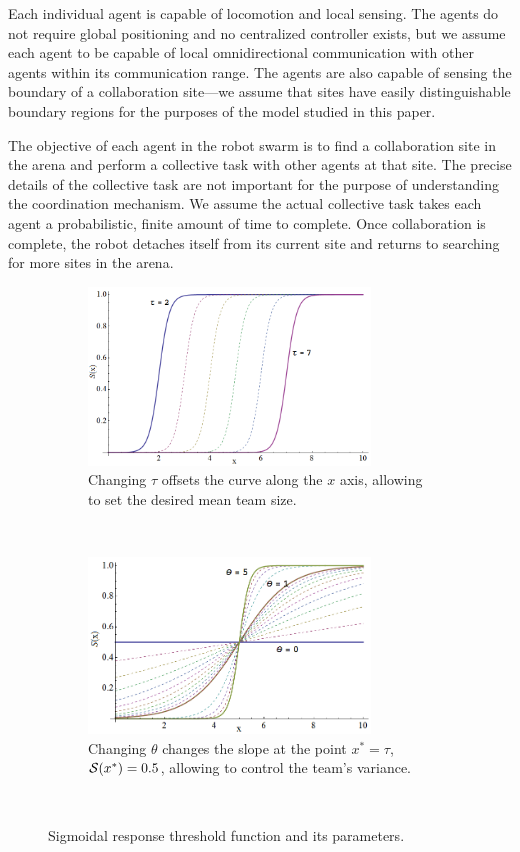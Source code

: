 \documentclass[Main.tex]{subfiles}
\begin{document}
Each individual agent is capable of locomotion and local sensing. The agents do not require global positioning and no centralized controller exists, but we assume each agent to be capable of local omnidirectional communication with other agents within its communication range. The agents are also capable of sensing the boundary of a collaboration site---we assume that sites have easily distinguishable boundary regions for the purposes of the model studied in this paper.

The objective of each agent in the robot swarm is to find a collaboration site in the arena and perform a collective task with other agents at that site. The precise details of the collective task are not important for the purpose of understanding the coordination mechanism. We assume the actual collective task takes each agent a probabilistic, finite amount of time to complete. Once collaboration is complete, the robot detaches itself from its current site and returns to searching for more sites in the arena. 

\begin{figure}[!htb]
\centering\begin{subfigure}{.5\textwidth}
\centering\includegraphics[width=7.5cm]{assets/sigmoid2.png}
\caption{Changing $\tau$ offsets the curve along the $x$ axis, allowing to set the desired mean team size.}\label{}
\end{subfigure}~
\centering\begin{subfigure}{.5\textwidth}
\centering\includegraphics[width=7.5cm]{assets/sigmoid1.png}
\caption{Changing $\theta$ changes the slope at the point $x^* = \tau$, $\mathcal{S}(x^*) = 0.5$, allowing to control the team's variance.}\label{}
\end{subfigure}~
\caption{Sigmoidal response threshold function and its parameters.}\label{fig:sig}
\end{figure}
\end{document}
